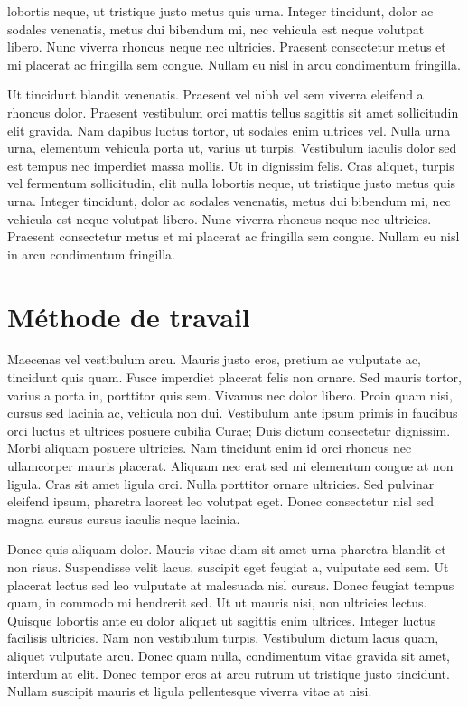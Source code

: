 lobortis neque, ut tristique justo metus quis urna. Integer tincidunt, dolor ac sodales venenatis, metus dui bibendum mi, nec vehicula est neque volutpat libero. Nunc viverra rhoncus neque nec ultricies. Praesent consectetur metus et mi placerat ac fringilla sem congue. Nullam eu nisl in arcu condimentum fringilla. 

Ut tincidunt blandit venenatis. Praesent vel nibh vel sem viverra eleifend a rhoncus dolor. Praesent vestibulum orci mattis tellus sagittis sit amet sollicitudin elit gravida. Nam dapibus luctus tortor, ut sodales enim ultrices vel. Nulla urna urna, elementum vehicula porta ut, varius ut turpis. Vestibulum iaculis dolor sed est tempus nec imperdiet massa mollis. Ut in dignissim felis. Cras aliquet, turpis vel fermentum sollicitudin, elit nulla lobortis neque, ut tristique justo metus quis urna. Integer tincidunt, dolor ac sodales venenatis, metus dui bibendum mi, nec vehicula est neque volutpat libero. Nunc viverra rhoncus neque nec ultricies. Praesent consectetur metus et mi placerat ac fringilla sem congue. Nullam eu nisl in arcu condimentum fringilla. 

\section{Méthode de travail}

Maecenas vel vestibulum arcu. Mauris justo eros, pretium ac vulputate ac, tincidunt quis quam. Fusce imperdiet placerat felis non ornare. Sed mauris tortor, varius a porta in, porttitor quis sem. Vivamus nec dolor libero. Proin quam nisi, cursus sed lacinia ac, vehicula non dui. Vestibulum ante ipsum primis in faucibus orci luctus et ultrices posuere cubilia Curae; Duis dictum consectetur dignissim. Morbi aliquam posuere ultricies. Nam tincidunt enim id orci rhoncus nec ullamcorper mauris placerat. Aliquam nec erat sed mi elementum congue at non ligula. Cras sit amet ligula orci. Nulla porttitor ornare ultricies. Sed pulvinar eleifend ipsum, pharetra laoreet leo volutpat eget. Donec consectetur nisl sed magna cursus cursus iaculis neque lacinia. 

Donec quis aliquam dolor. Mauris vitae diam sit amet urna pharetra blandit et non risus. Suspendisse velit lacus, suscipit eget feugiat a, vulputate sed sem. Ut placerat lectus sed leo vulputate at malesuada nisl cursus. Donec feugiat tempus quam, in commodo mi hendrerit sed. Ut ut mauris nisi, non ultricies lectus. Quisque lobortis ante eu dolor aliquet ut sagittis enim ultrices. Integer luctus facilisis ultricies. Nam non vestibulum turpis. Vestibulum dictum lacus quam, aliquet vulputate arcu. Donec quam nulla, condimentum vitae gravida sit amet, interdum at elit. Donec tempor eros at arcu rutrum ut tristique justo tincidunt. Nullam suscipit mauris et ligula pellentesque viverra vitae at nisi. 